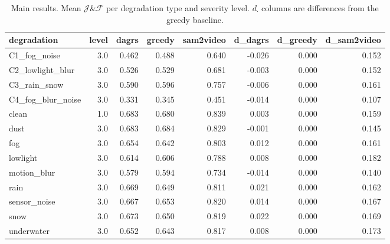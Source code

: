 \begin{table}[t]
\centering
\caption{Main results. Mean $\mathcal{J}\&\mathcal{F}$ per degradation type and severity level. $d_{\cdot}$ columns are differences from the greedy baseline.}
\label{tab:main}
\begin{tabular}{lrrrrrrr}
\toprule
degradation & level & dagrs & greedy & sam2video & d\_dagrs & d\_greedy & d\_sam2video \\
\midrule
C1\_fog\_noise & 3.0 & 0.462 & 0.488 & 0.640 & -0.026 & 0.000 & 0.152 \\
C2\_lowlight\_blur & 3.0 & 0.526 & 0.529 & 0.681 & -0.003 & 0.000 & 0.152 \\
C3\_rain\_snow & 3.0 & 0.590 & 0.596 & 0.757 & -0.006 & 0.000 & 0.161 \\
C4\_fog\_blur\_noise & 3.0 & 0.331 & 0.345 & 0.451 & -0.014 & 0.000 & 0.107 \\
clean & 1.0 & 0.683 & 0.680 & 0.839 & 0.003 & 0.000 & 0.159 \\
dust & 3.0 & 0.683 & 0.684 & 0.829 & -0.001 & 0.000 & 0.145 \\
fog & 3.0 & 0.654 & 0.642 & 0.803 & 0.012 & 0.000 & 0.161 \\
lowlight & 3.0 & 0.614 & 0.606 & 0.788 & 0.008 & 0.000 & 0.182 \\
motion\_blur & 3.0 & 0.579 & 0.594 & 0.734 & -0.014 & 0.000 & 0.140 \\
rain & 3.0 & 0.669 & 0.649 & 0.811 & 0.021 & 0.000 & 0.162 \\
sensor\_noise & 3.0 & 0.667 & 0.653 & 0.820 & 0.014 & 0.000 & 0.167 \\
snow & 3.0 & 0.673 & 0.650 & 0.819 & 0.022 & 0.000 & 0.169 \\
underwater & 3.0 & 0.652 & 0.643 & 0.817 & 0.008 & 0.000 & 0.173 \\
\bottomrule
\end{tabular}
\end{table}
